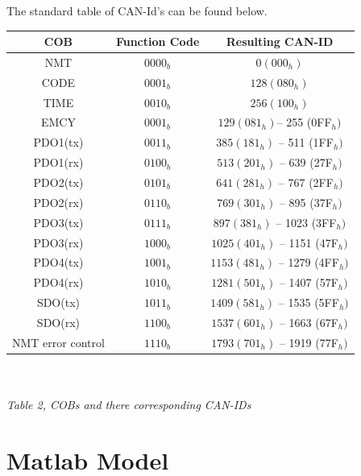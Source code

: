 


The standard table of CAN-Id's can be found below.

\begin{tabular}{|c|c|c|}
	\hline 
	\textbf{COB} & \textbf{Function Code} & \textbf{Resulting CAN-ID} \\ 
	\hline 
	NMT &  0000$_{b}$  & $0 (000_{h})$  \\ 
	\hline 
	CODE & $0001_{b}$ &  $128 (080_{h})$\\ 
	\hline 
	TIME & $0010_{b}$ &  $256 (100_{h})$\\ 
	\hline 
	EMCY & $0001_{b}$ &   $129 (081_{h}) $–  255 (0FF$_{h})$ \\ 
	\hline 
	PDO1(tx) & $0011_{b}$ &  $385 (181_{h}) $ – 511 (1FF$_{h})$\\ 
	\hline 
	PDO1(rx) & $0100_{b}$ &  $513 (201_{h}) $ –  639 (27F$_{h})$\\ 
	\hline 
	PDO2(tx) & $0101_{b}$ &  $641 (281_{h}) $ –  767 (2FF$_{h})$\\ 
	\hline 
	PDO2(rx) & $0110_{b}$ &  $769 (301_{h})$  –  895 (37F$_{h})$\\ 
	\hline 
	PDO3(tx) & $0111_{b}$ &  $897 (381_{h}) $ – 1023 (3FF$_{h})$\\ 
	\hline 
	PDO3(rx) & $1000_{b}$ &  $1025 (401_{h}) $ –  1151 (47F$_{h})$\\ 
	\hline 
	PDO4(tx) & $1001_{b}$ &  $1153 (481_{h}) $ –  1279 (4FF$_{h})$\\ 
	\hline 
	PDO4(rx) & $1010_{b}$ & $1281 (501_{h}) $ –  1407 (57F$_{h})$\\ 
	\hline 
	SDO(tx) & $1011_{b}$ & $ 1409 (581_{h}) $ –  1535 (5FF$_{h})$\\ 
	\hline 
	SDO(rx) & $1100_{b}$ & $1537 (601_{h}) $ –  1663 (67F$_{h})$\\ 
	\hline 
	NMT error control &$ 1110_{b} $& $ 1793 (701_{h}) $ –  1919 (77F$_{h})$\\ 
	\hline 
\end{tabular} 
\\
\\
\textit{Table 2, COBs and there corresponding CAN-IDs}









\section{Matlab Model}

